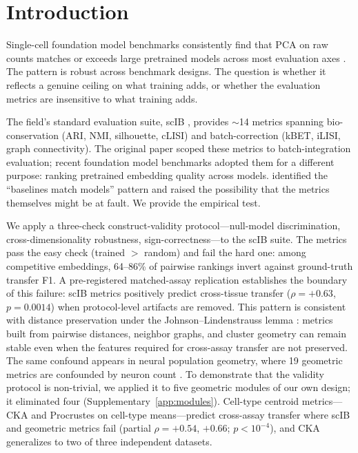 \documentclass[11pt]{article}
\begin{document}
\section{Introduction}
\label{sec:intro}

Single-cell foundation model benchmarks consistently find that PCA on raw counts matches or exceeds large pretrained models across most evaluation axes \citep{wu2025scfm, vcbench2026, unifiedscfm2026, cellxgeneintegration2026}. The pattern is robust across benchmark designs. The question is whether it reflects a genuine ceiling on what training adds, or whether the evaluation metrics are insensitive to what training adds.

The field's standard evaluation suite, scIB \citep{luecken2022scib}, provides $\sim$14 metrics spanning bio-conservation (ARI, NMI, silhouette, cLISI) and batch-correction (kBET, iLISI, graph connectivity). The original paper scoped these metrics to batch-integration evaluation; recent foundation model benchmarks \citep{wu2025scfm, vcbench2026, unifiedscfm2026, cellxgeneintegration2026} adopted them for a different purpose: ranking pretrained embedding quality across models. \citet{wu2025scfm} identified the ``baselines match models'' pattern and raised the possibility that the metrics themselves might be at fault. We provide the empirical test.

We apply a three-check construct-validity protocol---null-model discrimination, cross-dimensionality robustness, sign-correctness---to the scIB suite. The metrics pass the easy check (trained $>$ random) and fail the hard one: among competitive embeddings, 64--86\% of pairwise rankings invert against ground-truth transfer F1. A pre-registered matched-assay replication establishes the boundary of this failure: scIB metrics positively predict cross-tissue transfer ($\rho = +0.63$, $p = 0.0014$) when protocol-level artifacts are removed. This pattern is consistent with distance preservation under the Johnson--Lindenstrauss lemma \citep{johnsonlindenstrauss1984}: metrics built from pairwise distances, neighbor graphs, and cluster geometry can remain stable even when the features required for cross-assay transfer are not preserved. The same confound appears in neural population geometry, where 19 geometric metrics are confounded by neuron count \citep{tower2026bracket}. To demonstrate that the validity protocol is non-trivial, we applied it to five geometric modules of our own design; it eliminated four (Supplementary~\ref{app:modules}). Cell-type centroid metrics---CKA and Procrustes on cell-type means---predict cross-assay transfer where scIB and geometric metrics fail (partial $\rho = +0.54$, $+0.66$; $p < 10^{-4}$), and CKA generalizes to two of three independent datasets.
\end{document}
